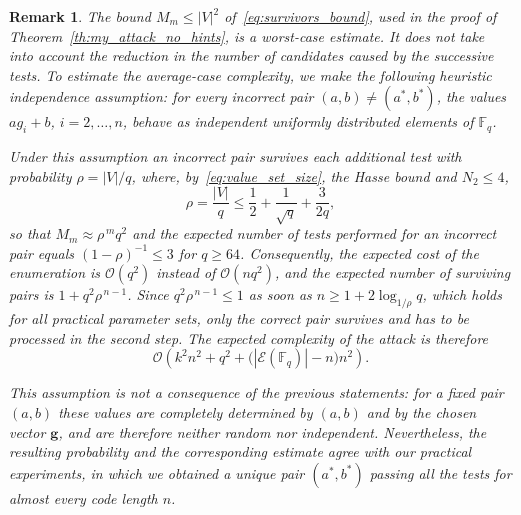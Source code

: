 \documentclass[sn-mathphys-num]{sn-jnl_modified}
\newcommand{\FF}{\ensuremath{\mathbb{F}}}
\newtheorem{remark}{Remark}
\begin{document}
\begin{remark}\label{rem:expected_complexity}
The bound $M_m \leq |V|^2$ of~\eqref{eq:survivors_bound}, used in the proof of Theorem~\ref{th:my_attack_no_hints}, is a worst-case estimate. It does not take into account the reduction in the number of candidates caused by the successive tests. To estimate the average-case complexity, we make the following heuristic independence assumption: for every incorrect pair $(a,b) \neq (a^*,b^*)$, the values $a g_i + b$, $i = 2,\dots,n$, behave as independent uniformly distributed elements of $\FF_q$. 

Under this assumption an incorrect pair survives each additional test with probability $\rho = |V|/q$, where, by~\eqref{eq:value_set_size}, the Hasse bound and $N_2 \leq 4$,
\begin{equation}\label{eq:rho_bound}
\rho = \frac{|V|}{q} \leq \frac{1}{2} + \frac{1}{\sqrt q} + \frac{3}{2q},
\end{equation}
so that $M_m \approx \rho^{\,m} q^2$ and the expected number of tests performed for an incorrect pair equals $(1-\rho)^{-1} \leq 3$ for $q \geq 64$. Consequently, the expected cost of the enumeration is $\mathcal{O}(q^2)$ instead of $\mathcal{O}(nq^2)$, and the expected number of surviving pairs is $1 + q^2\rho^{\,n-1}$. Since $q^2 \rho^{\,n-1} \leq 1$ as soon as $n \geq 1 + 2\log_{1/\rho} q$, which holds for all practical parameter sets, only the correct pair survives and has to be processed in the second step. The expected complexity of the attack is therefore
\[
\mathcal{O}\!\left(k^2n^2 + q^2 + \bigl(|\mathcal{E}(\FF_q)| - n\bigr)n^2\right).
\]

This assumption is not a consequence of the previous statements: for a fixed pair $(a,b)$ these values are completely determined by $(a,b)$ and by the chosen vector $\mathbf{g}$, and are therefore neither random nor independent. Nevertheless, the resulting probability and the corresponding estimate agree with our practical experiments, in which we obtained a unique pair $(a^*, b^*)$ passing all the tests for almost every code length $n$.
\end{remark}
\end{document}
